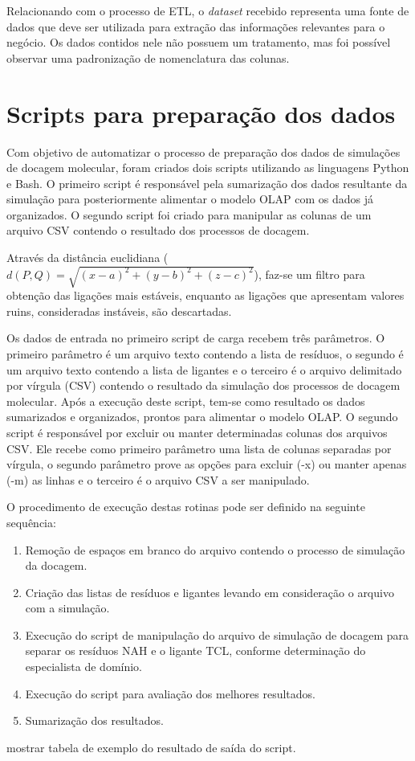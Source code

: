 Relacionando com o processo de ETL, o \emph{dataset} recebido representa uma fonte de dados que deve ser utilizada para extração das informações relevantes para o negócio. Os dados contidos nele não possuem um tratamento, mas foi possível observar uma padronização de nomenclatura das colunas.

\section{Scripts para preparação dos dados}

Com objetivo de automatizar o processo de preparação dos dados de simulações de docagem molecular, foram criados dois scripts utilizando as linguagens Python e Bash. O primeiro script é responsável pela sumarização dos dados resultante da simulação para posteriormente alimentar o modelo OLAP com os dados já organizados. O segundo script foi criado para manipular as colunas de um arquivo CSV contendo o resultado dos processos de docagem.

Através da distância euclidiana ($d(P, Q)= \sqrt{(x - a)^{2} +(y - b)^{2} + (z - c)^{2}}$), faz-se um filtro para obtenção das ligações mais estáveis, enquanto as ligações que apresentam valores ruins, consideradas instáveis, são descartadas.

Os dados de entrada no primeiro script de carga recebem três parâmetros. O primeiro parâmetro é um arquivo texto contendo a lista de resíduos, o segundo é um arquivo texto contendo a lista de ligantes e o terceiro é o arquivo delimitado por vírgula (CSV) contendo o resultado da simulação dos processos de docagem molecular. Após a execução deste script, tem-se como resultado os dados sumarizados e organizados, prontos para alimentar o modelo OLAP. O segundo script é responsável por excluir ou manter determinadas colunas dos arquivos CSV. Ele recebe como primeiro parâmetro uma lista de colunas separadas por vírgula, o segundo parâmetro prove as opções para excluir (-x) ou manter apenas (-m) as linhas e o terceiro é o arquivo CSV a ser manipulado.

O procedimento de execução destas rotinas pode ser definido na seguinte sequência:

\begin{enumerate}
    \item Remoção de espaços em branco do arquivo contendo o processo de simulação da docagem. 
    \item Criação das listas de resíduos e ligantes levando em consideração o arquivo com a simulação.
    \item Execução do script de manipulação do arquivo de simulação de docagem para separar os resíduos NAH e o ligante TCL, conforme determinação do especialista de domínio.
    \item Execução do script para avaliação dos melhores resultados.
    \item Sumarização dos resultados.
\end{enumerate}

mostrar tabela de exemplo do resultado de saída do script.
